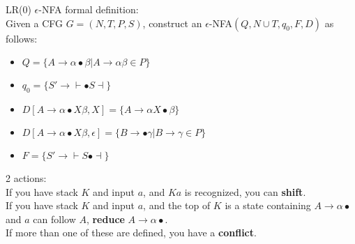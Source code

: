 \documentclass[12pt]{article}
\begin{document}
\noindent
LR(0) $\epsilon$-NFA formal definition:\\
Given a CFG $G = (N, T, P, S)$, construct an $ \epsilon$-NFA$(Q, N\cup T, q_0, F, D)$ as follows:
\begin{itemize}
	\renewcommand\labelitemi{--}
	\item $Q = \{A \rightarrow \alpha \bullet \beta | A \rightarrow \alpha\beta\in P \}$
	\item $q_0 = \{S' \rightarrow \vdash \bullet S \dashv  \}$
	\item $D[A\rightarrow \alpha \bullet X\beta, X] = \{A \rightarrow \alpha X\bullet \beta \}$
	\item $D[A\rightarrow \alpha \bullet X\beta, \epsilon] = \{B \rightarrow \bullet\gamma|B\rightarrow\gamma\in P \}$
	\item $F = \{S' \rightarrow \vdash S \bullet \dashv \}$
\end{itemize}
2 actions:\\
If you have stack $K$ and input $a$, and $Ka$ is recognized, you can \textbf{shift}.\\
If you have stack $K$ and input $a$, and the top of $K$ is a state containing $A \rightarrow \alpha\bullet$ and $a$ can follow $A$, \textbf{reduce} $A\rightarrow\alpha\bullet$.\\
If more than one of these are defined, you have a \textbf{conflict}.\\
\end{document}
